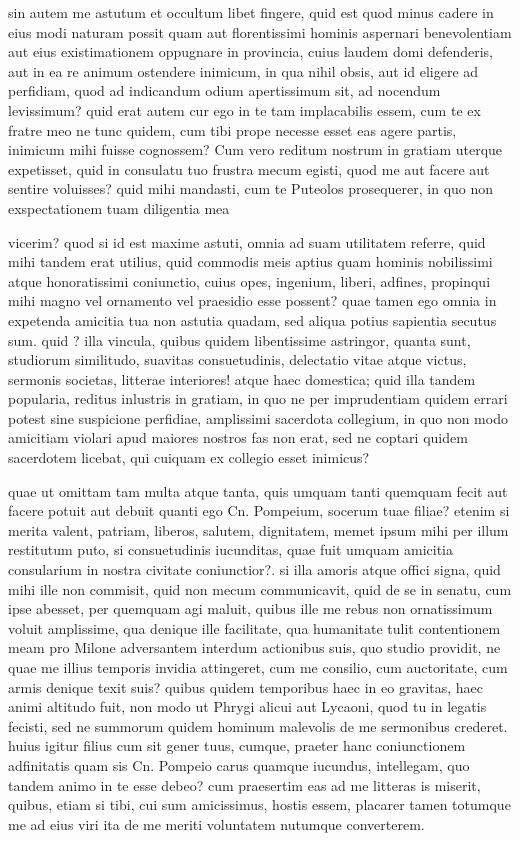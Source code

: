  sin autem me astutum et occultum libet fingere, quid est quod minus cadere in eius modi naturam possit quam aut florentissimi hominis aspernari benevolentiam aut eius existimationem oppugnare in provincia, cuius laudem domi defenderis, aut in ea re animum ostendere inimicum, in qua nihil obsis, aut id eligere ad perfidiam, quod ad indicandum odium apertissimum sit, ad nocendum levissimum? quid erat autem cur ego in te tam implacabilis essem, cum te ex fratre meo ne tunc quidem, cum tibi prope necesse esset eas agere partis, inimicum mihi fuisse cognossem? Cum vero reditum nostrum in gratiam uterque expetisset, quid in consulatu tuo frustra mecum egisti, quod me aut facere aut sentire voluisses? quid mihi mandasti, cum te Puteolos prosequerer, in quo non exspectationem tuam diligentia mea

 vicerim? quod si id est maxime astuti, omnia ad suam utilitatem referre, quid mihi tandem erat utilius, quid commodis meis aptius quam hominis nobilissimi atque honoratissimi coniunctio, cuius opes, ingenium, liberi, adfines, propinqui mihi magno vel ornamento vel praesidio esse possent? quae tamen ego omnia in expetenda amicitia tua non astutia quadam, sed aliqua potius sapientia secutus sum. quid ? illa vincula, quibus quidem libentissime astringor, quanta sunt, studiorum similitudo, suavitas consuetudinis, delectatio vitae atque victus, sermonis societas, litterae interiores! atque haec domestica; quid illa tandem popularia, reditus inlustris in gratiam, in quo ne per imprudentiam quidem errari potest sine suspicione perfidiae, amplissimi sacerdota collegium, in quo non modo amicitiam violari apud maiores nostros fas non erat, sed ne coptari quidem sacerdotem licebat, qui cuiquam ex collegio esset inimicus?

 quae ut omittam tam multa atque tanta, quis umquam tanti quemquam fecit aut facere potuit aut debuit quanti ego Cn. Pompeium, socerum tuae filiae? etenim si merita valent, patriam, liberos, salutem, dignitatem, memet ipsum mihi per illum restitutum puto, si consuetudinis iucunditas, quae fuit umquam amicitia consularium in nostra civitate coniunctior?. si illa amoris atque offici signa, quid mihi ille non commisit, quid non mecum communicavit, quid de se in senatu, cum ipse abesset, per quemquam agi maluit, quibus ille me rebus non ornatissimum voluit amplissime, qua denique ille facilitate, qua humanitate tulit contentionem meam pro Milone adversantem interdum actionibus suis, quo studio providit, ne quae me illius temporis invidia attingeret, cum me consilio, cum auctoritate, cum armis denique texit suis? quibus quidem temporibus haec in eo gravitas, haec animi altitudo fuit, non modo ut Phrygi alicui aut Lycaoni, quod tu in legatis fecisti, sed ne summorum quidem hominum malevolis de me sermonibus crederet. huius igitur filius cum sit gener tuus, cumque, praeter hanc coniunctionem adfinitatis quam sis Cn. Pompeio carus quamque iucundus, intellegam, quo tandem animo in te esse debeo? cum praesertim eas ad me litteras is miserit, quibus, etiam si tibi, cui sum amicissimus, hostis essem, placarer tamen totumque me ad eius viri ita de me meriti voluntatem nutumque converterem.

